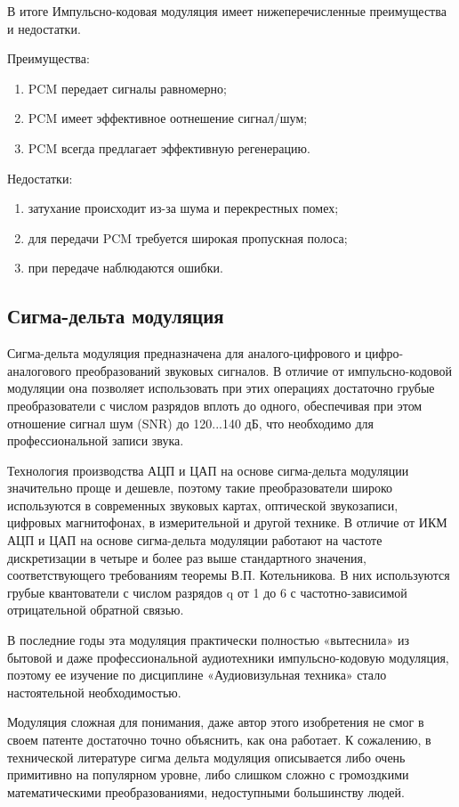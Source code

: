 \documentclass[12pt,a4paper,oneside]{report}
\begin{document}
В итоге Импульсно-кодовая модуляция имеет нижеперечисленные преимущества и недостатки.

Преимущества:
\begin{enumerate}
	\item PCM передает сигналы равномерно;
	\item PCM имеет эффективное оотнешение сигнал/шум;
	\item PCM всегда предлагает эффективную регенерацию.
\end{enumerate}

Недостатки:
\begin{enumerate}
	\item затухание происходит из-за шума и перекрестных помех;
	\item для передачи PCM требуется широкая пропускная полоса;
	\item при передаче наблюдаются ошибки.
\end{enumerate}

\subsection{Сигма-дельта модуляция}
\quad
Сигма-дельта модуляция предназначена для аналого-цифрового и цифро-аналогового преобразований звуковых сигналов. В отличие от импульсно-кодовой модуляции она позволяет использовать при этих операциях достаточно грубые преобразователи с числом разрядов вплоть до одного, обеспечивая при этом отношение сигнал шум (SNR) до 120...140 дБ, что необходимо для профессиональной записи звука\cite{eleven}.

Технология производства АЦП и ЦАП на основе сигма-дельта модуляции значительно проще и дешевле, поэтому такие преобразователи широко используются в современных звуковых картах, оптической звукозаписи, цифровых магнитофонах, в измерительной и другой технике. В отличие от ИКМ АЦП и ЦАП на основе сигма-дельта модуляции работают на частоте дискретизации в четыре и более раз выше стандартного значения, соответствующего требованиям теоремы В.П. Котельникова. В них используются грубые квантователи с числом разрядов q от 1 до 6 с частотно-зависимой отрицательной обратной связью\cite{twelve}.

В последние годы эта модуляция практически полностью «вытеснила» из бытовой и даже профессиональной аудиотехники импульсно-кодовую модуляция, поэтому ее изучение по дисциплине «Аудиовизульная техника» стало настоятельной необходимостью.

Модуляция сложная для понимания, даже автор этого изобретения не смог в своем патенте достаточно точно объяснить, как она работает. К сожалению, в технической литературе сигма дельта модуляция описывается либо очень примитивно на популярном уровне, либо слишком сложно с громоздкими математическими преобразованиями, недоступными большинству людей.
\end{document}
